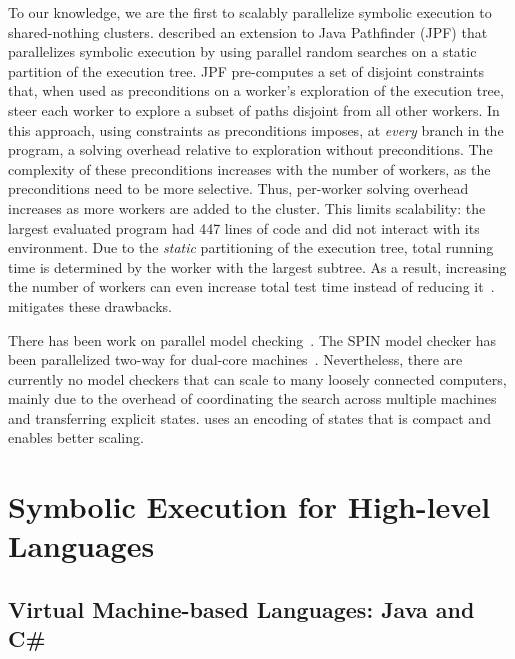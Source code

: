 To our knowledge, we are the first to scalably parallelize symbolic execution to shared-nothing clusters.
%
\cite{parallelSymbex} described an extension to Java Pathfinder (JPF) that parallelizes symbolic execution by using parallel random searches on a static partition of the execution tree.  JPF pre-computes a set of disjoint constraints that, when used as preconditions on a worker's exploration of the execution tree, steer each worker to explore a subset of paths disjoint from all other workers.  In this approach, using constraints as preconditions imposes, at {\em every} branch in the program, a solving overhead relative to exploration without preconditions.  The complexity of these preconditions increases with the number of workers, as the preconditions need to be more selective.  Thus, per-worker solving overhead increases as more workers are added to the cluster.  This limits scalability: the largest evaluated program had 447 lines of code and did not interact with its environment.  Due to the {\em static} partitioning of the execution tree, total running time is determined by the worker with the largest subtree.  As a result, increasing the number of workers can even increase total test time instead of reducing it~\cite{parallelSymbex}.  \cnine mitigates these drawbacks.

There has been work on parallel model checking~\cite{parallelMurphi,distributed-spin,loadBalModelchecking,spin:multicore-modelchecking,modelCheckBDD}.  The SPIN model checker has been parallelized two-way for dual-core machines~\cite{parallelSPIN}. Nevertheless, there are currently no model checkers that can scale to many loosely connected computers, mainly due to the overhead of coordinating the search across multiple machines and transferring explicit states. \cnine uses an encoding of states that is compact and enables better scaling.

\fi


\section{Symbolic Execution for High-level Languages}
\label{sec:relwork:interplang}

\subsection{Virtual Machine-based Languages: Java and C\#}

